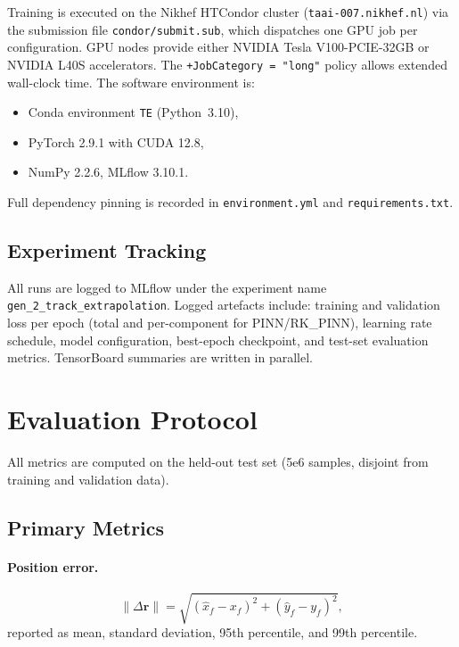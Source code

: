 \documentclass[a4paper,11pt]{article}
\newcommand{\num}[1]{#1}
\begin{document}
Training is executed on the Nikhef HTCondor cluster
(\texttt{taai-007.nikhef.nl}) via the submission file
\texttt{condor/submit.sub}, which dispatches one GPU job per
configuration.  GPU nodes provide either NVIDIA Tesla V100-PCIE-32GB or
NVIDIA L40S accelerators.  The \texttt{+JobCategory = "long"} policy
allows extended wall-clock time.  The software environment is:
\begin{itemize}
  \item Conda environment \texttt{TE} (Python~3.10),
  \item PyTorch 2.9.1 with CUDA 12.8,
  \item NumPy 2.2.6, MLflow 3.10.1.
\end{itemize}
Full dependency pinning is recorded in \texttt{environment.yml} and
\texttt{requirements.txt}.

\subsection{Experiment Tracking}

\begin{sloppypar}
All runs are logged to MLflow under the experiment name
\nolinkurl{gen_2_track_extrapolation}.  Logged artefacts include:
training and validation loss per epoch (total and per-component for
PINN/RK\_PINN), learning rate schedule, model configuration,
best-epoch checkpoint, and test-set evaluation metrics.  TensorBoard
summaries are written in parallel.
\end{sloppypar}

\section{Evaluation Protocol}
\label{sec:evaluation}

All metrics are computed on the held-out test set (\num{5e6} samples,
disjoint from training and validation data).

\subsection{Primary Metrics}

\paragraph{Position error.}
\begin{equation}
  \|\Delta \mathbf{r}\| = \sqrt{(\hat{x}_f - x_f)^2 + (\hat{y}_f - y_f)^2},
  \label{eq:pos_err}
\end{equation}
reported as mean, standard deviation, 95th percentile, and 99th percentile.
\end{document}
